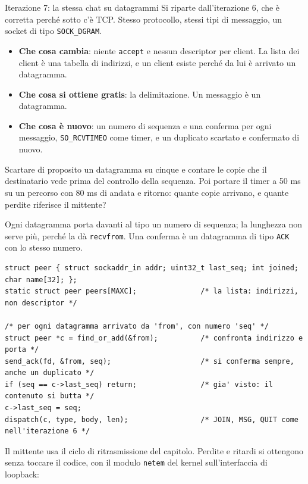 \begin{esercizio}{Iterazione 7: la stessa chat su datagrammi}
Si riparte dall'iterazione 6, che è corretta perché sotto c'è TCP. Stesso protocollo, stessi tipi di messaggio, un socket
di tipo \texttt{SOCK\_DGRAM}.
\begin{itemize}
    \item \textbf{Che cosa cambia}: niente \texttt{accept} e nessun descriptor per client. La lista dei client è una
          tabella di indirizzi, e un client esiste perché da lui è arrivato un datagramma.
    \item \textbf{Che cosa si ottiene gratis}: la delimitazione. Un messaggio è un datagramma.
    \item \textbf{Che cosa è nuovo}: un numero di sequenza e una conferma per ogni messaggio, \texttt{SO\_RCVTIMEO} come
          timer, e un duplicato scartato e confermato di nuovo.
\end{itemize}
Scartare di proposito un datagramma su cinque e contare le copie che il destinatario vede prima del controllo della
sequenza. Poi portare il timer a 50 ms su un percorso con 80 ms di andata e ritorno: quante copie arrivano, e quante
perdite riferisce il mittente?

\svolgimento
Ogni datagramma porta davanti al tipo un numero di sequenza; la lunghezza non serve più, perché la dà
\texttt{recvfrom}. Una conferma è un datagramma di tipo \texttt{ACK} con lo stesso numero.

\begin{lstlisting}[language={[POSIX]C}, style=wnumbers, title={chatd.c: il lato che riceve}]
struct peer { struct sockaddr_in addr; uint32_t last_seq; int joined; char name[32]; };
static struct peer peers[MAXC];               /* la lista: indirizzi, non descriptor */

/* per ogni datagramma arrivato da 'from', con numero 'seq' */
struct peer *c = find_or_add(&from);          /* confronta indirizzo e porta */
send_ack(fd, &from, seq);                     /* si conferma sempre, anche un duplicato */
if (seq == c->last_seq) return;               /* gia' visto: il contenuto si butta */
c->last_seq = seq;
dispatch(c, type, body, len);                 /* JOIN, MSG, QUIT come nell'iterazione 6 */
\end{lstlisting}

Il mittente usa il ciclo di ritrasmissione del capitolo. Perdite e ritardi si ottengono senza toccare il codice, con il
modulo \texttt{netem} del kernel sull'interfaccia di loopback:


\end{esercizio}
